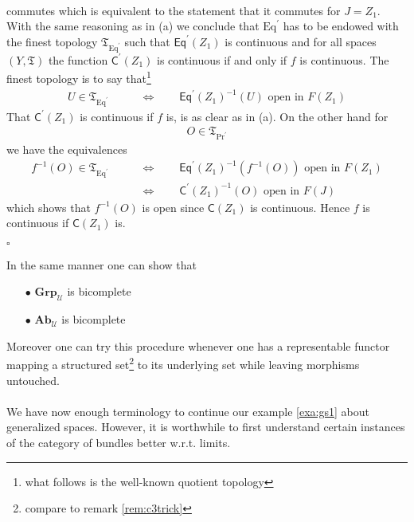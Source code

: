 \begin{prf}
\begin{enumerate}
\[\begin{tikzcd}[sep=large]
\end{tikzcd}
\]
commutes which is equivalent to the statement that it commutes for $J = Z_{1}$. With the same reasoning as in (a) we conclude that $\mathrm{Eq}^{\prime}$ has to be endowed with the finest topology $\mathfrak{T}_{\mathrm{Eq}^{\prime}}$ such that $\mathsf{Eq}^{\prime}(Z_{1})$ is continuous and for all spaces $(Y,\mathfrak{T})$ the function $\mathsf{C}^{\prime}(Z_{1})$ is continuous if and only if $f$ is continuous. The finest topology is to say that\footnote{what follows is the well-known quotient topology}
\begin{align*}
  U
  \in
  \mathfrak{T}_{\mathrm{Eq}^{\prime}}
  \qquad
  &\Leftrightarrow
  \qquad
  \mathsf{Eq}^{\prime}(Z_{1})^{-1}
  (U)
  \text{ open in }
  F(Z_{1})
\end{align*}
That $\mathsf{C}^{\prime}(Z_{1})$ is continuous if $f$ is, is as clear as in (a). On the other hand for
\begin{align*}
  O
  \in
  \mathfrak{T}_{\mathrm{Pr}^{\prime}}
\end{align*}
we have the equivalences
\begin{align*}
  f^{-1}(O)
  \in
  \mathfrak{T}_{\mathrm{Eq}^{\prime}}
  \qquad
  &\Leftrightarrow
  \qquad
  \mathsf{Eq}^{\prime}(Z_{1})^{-1}
  \left(
    f^{-1}(O)
  \right)
  \text{ open in }
  F(Z_{1})
  \\
  &\Leftrightarrow
  \qquad
  \mathsf{C}^{\prime}(Z_{1})^{-1}
  (O)
  \text{ open in }
  F(J)
\end{align*}
which shows that $f^{-1}(O)$ is open since $\mathsf{C}(Z_{1})$ is continuous. Hence $f$ is continuous if $\mathsf{C}(Z_{1})$ is.
\end{enumerate}
\phantom{proven}
\hfill
$\square$
\end{prf}
In the same manner one can show that
\begin{enumerate}
\item[$\bullet$]
$\mathbf{Grp}_{\mathcal{U}}$ is bicomplete
\item[$\bullet$]
$\mathbf{Ab}_{\mathcal{U}}$ is bicomplete
\end{enumerate}
Moreover one can try this procedure whenever one has a representable functor mapping a structured set\footnote{compare to remark \ref{rem:c3trick}} to its underlying set while leaving morphisms untouched.
\\\\
We have now enough terminology to continue our example \ref{exa:gs1} about generalized spaces. However, it is worthwhile to first understand certain instances of the category of bundles better w.r.t. limits.
